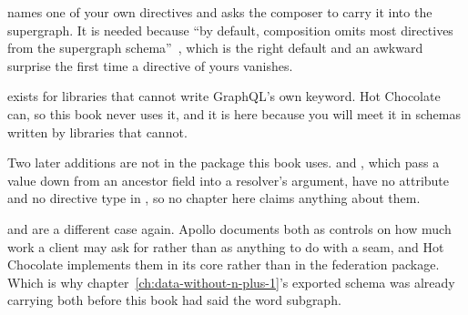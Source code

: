 %
 names one of your own directives and asks the composer
to carry it into the supergraph. It is needed because \enquote{by default,
composition omits most directives from the supergraph
schema}~\autocite{apollodirectives}, which is the right default and an awkward
surprise the first time a directive of yours vanishes.

%
 exists for libraries that
cannot write GraphQL's own  keyword. Hot Chocolate can, so this
book never uses it, and it is here because you will meet it in schemas written
by libraries that cannot.

%
Two later additions are not in the package this book uses.  and
, which pass a value down from an ancestor field into a
resolver's argument, have no attribute and no directive type in
, so no chapter here claims anything about
them.

%
 and  are a different case again. Apollo documents
both as controls on how much work a client may ask
for rather than as anything to do with a seam, and Hot Chocolate implements
them in its core rather than in the federation package. Which is why
chapter~\ref{ch:data-without-n-plus-1}'s exported schema was already carrying
both before this book had said the word subgraph.
%
